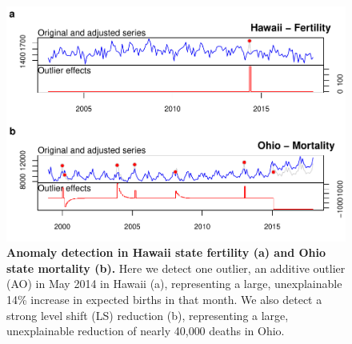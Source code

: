 \documentclass[12pt]{article}
\begin{document}
\begin{figure}
\centering
\includegraphics{manuscript_files/figure-latex/AnomalyHawaii-1.pdf}
\caption{\textbf{Anomaly detection in Hawaii state fertility (a) and Ohio state mortality (b).}
Here we detect one outlier, an additive outlier (AO) in May 2014 in
Hawaii (a), representing a large, unexplainable 14\% increase in
expected births in that month. We also detect a strong level shift (LS)
reduction (b), representing a large, unexplainable reduction of nearly
40,000 deaths in Ohio. \label{fig:ferthawaii}}
\end{figure}

\newpage



\end{document}
